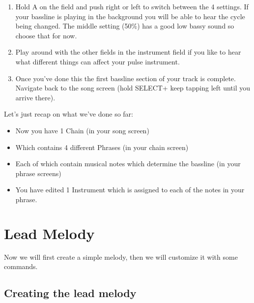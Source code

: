 \documentclass[]{article}
\newcommand{\buttonStyle}[1]{\textsf{#1}\xspace}
\newcommand{\bA}{\buttonStyle{A}}
\newcommand{\bSelect}{\buttonStyle{{SELECT}}}
\newcommand{\bRight}{\buttonStyle{right}}
\newcommand{\bLeft}{\buttonStyle{left}}
\begin{document}
\begin{enumerate}[resume]

\item  Hold \bA on the field and push \bRight or \bLeft to switch between the 4 settings. If your bassline is playing in the background you will be able to hear the cycle being changed. The middle setting (50\%) has a good low bassy sound so choose that for now.

\item Play around with the other fields in the instrument field if you like to hear what different things can affect your pulse instrument.

\item Once you've done this the first bassline section of your track is complete. Navigate back to the song screen (hold \bSelect + keep tapping \bLeft until you arrive there).


\end{enumerate}

Let's just recap on what we've done so far: 
\begin{itemize}
	\item Now you have 1 Chain (in your song screen)
	\item  Which contains 4 different Phrases (in your chain screen) 
	\item Each of which contain musical notes which determine the bassline (in your phrase screens)
	\item  You have edited 1 Instrument which is assigned to each of the notes in your phrase.
	
\end{itemize}



\section{Lead Melody}

Now we will first create a simple melody, then we will customize it with some commands.

\subsection{Creating the lead melody}
\end{document}
